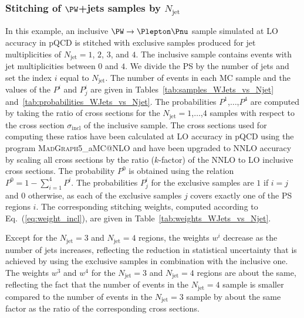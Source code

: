 \documentclass[twocolumn,epjc3]{svjour3}
\makeatletter
\newcommand{\incl}{\ensuremath{\textrm{incl}}\xspace}
\newcommand{\jet}{\ensuremath{\textrm{jet}}\xspace}
\newcommand{\MGvATNLO}{\textsc{MadGraph5}\_aMC@NLO\xspace}
\makeatother
\begin{document}
\subsubsection{Stitching of \texorpdfstring{$\PW$}{W}+jets samples by \texorpdfstring{$N_{\jet}$}{Njet}}
\label{sec:WJets_vs_Njet}

In this example, an inclusive $\PW \to \Plepton\Pnu$ sample simulated at LO accuracy in pQCD 
is stitched with exclusive samples produced for jet multiplicities of $N_{\jet} = 1$, $2$, $3$, and $4$.
The inclusive sample contains events with jet multiplicities between $0$ and $4$.
We divide the PS by the number of jets and set the index $i$ equal to $N_{\jet}$.
The number of events in each MC sample and the values of the $P^{i}$ and $P_{j}^{i}$ are given in 
Tables~\ref{tab:samples_WJets_vs_Njet} and~\ref{tab:probabilities_WJets_vs_Njet}.
The probabilities $P^{1}$,$\ldots$,$P^{4}$ are computed by taking the ratio of cross sections 
for the $N_{\jet} = 1$,$\ldots$,$4$ samples with respect to the cross section $\sigma_{\incl}$ of the inclusive sample.
The cross sections used for computing these ratios have been calculated at LO accuracy in pQCD using the program \MGvATNLO
and have been upgraded to NNLO accuracy by scaling all cross sections by the ratio ($k$-factor) of the NNLO to LO inclusive cross sections.
The probability $P^{0}$ is obtained using the relation $P^{0} = 1 - \sum_{i=1}^{4} P^{i}$.
The probabilities $P_{j}^{i}$ for the exclusive samples are $1$ if $i=j$ and $0$ otherwise,
as each of the exclusive samples $j$ covers exactly one of the PS regions $i$.
The corresponding stitching weights, computed according to Eq.~(\ref{eq:weight_incl}), are given in Table~\ref{tab:weights_WJets_vs_Njet}.

Except for the $N_{\jet} = 3$ and $N_{\jet} = 4$ regions,
the weights $w^{i}$ decrease as the number of jets increases, 
reflecting the reduction in statistical uncertainty that is achieved by using the exclusive samples in combination with the inclusive one.
The weights $w^{3}$ and $w^{4}$ for the $N_{\jet} = 3$ and $N_{\jet} = 4$ regions are about the same,
reflecting the fact that the number of events in the $N_{\jet} = 4$ sample is smaller compared to the number of events in the $N_{\jet} = 3$ sample
by about the same factor as the ratio of the corresponding cross sections.
\end{document}
